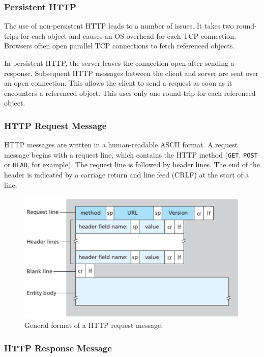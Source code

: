 \subsubsection{Persistent HTTP}

The use of non-persistent HTTP leads to a number of issues.
It takes two round-trips for each object and causes an OS overhead for each TCP connection.
Browsers often open parallel TCP connections to fetch referenced objects.

In persistent HTTP, the server leaves the connection open after sending a response.
Subsequent HTTP messages between the client and server are sent over an open connection.
This allows the client to send a request as soon as it encounters a referenced object.
This uses only one round-trip for each referenced object.

\subsubsection{HTTP Request Message}

HTTP messages are written in a human-readable ASCII format.
A request message begins with a request line, which contains the HTTP method (\texttt{GET}, \texttt{POST} or \texttt{HEAD}, for example).
The request line is followed by header lines.
The end of the header is indicated by a carriage return and line feed (CRLF) at the start of a line.

\begin{figure}[htp]
  \centering
  \includegraphics[width=12cm]{unit-17/figures/http-request.png}
  \caption*{General format of a HTTP request message.}
\end{figure}

\subsubsection{HTTP Response Message}

